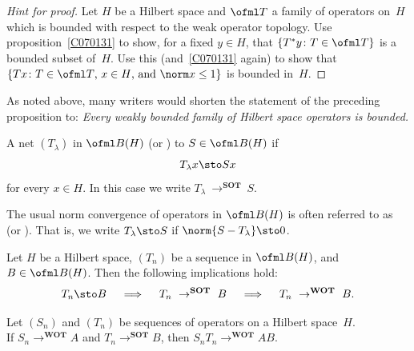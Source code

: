 \begin{proof}[\emph{Hint for proof}] Let $H$ be a Hilbert space and $\ofml T$ a family of operators on~$H$
which is bounded with respect to the weak operator topology. Use proposition~\ref{C070131} to show, for a
fixed $y \in H$, that $\{T^*y\colon T \in \ofml T\}$ is a bounded subset of~$H$.  Use this (and~\ref{C070131}
again) to show that $\{Tx\colon \text{$T \in \ofml T$, $x \in H$, and $\norm x \le 1$}\}$ is bounded in~$H$. \ns
\end{proof}

As noted above, many writers would shorten the statement of the preceding proposition to:
\emph{Every weakly bounded family of Hilbert space operators is bounded.}

\begin{defn}
A net $(T_\lambda)$ in $\ofml B(H)$
 (or ) to $S \in \ofml B(H)$ if
  \[ T_\lambda x \sto Sx \]
for every $x \in H$.  In this case we write $T_\lambda~\to^{\textbf{SOT}}~S$.

The usual norm convergence of operators in $\ofml B(H)$ is often referred to as
 (or ).  That is, we write
$T_\lambda \sto S$ if $\norm{S - T_\lambda}\sto 0$.
\end{defn}

\begin{prop} Let $H$ be a Hilbert space, $(T_n)$ be a sequence in $\ofml B(H)$,
and $B \in \ofml B(H)$. Then the following implications hold:
   \[ T_n \sto B \quad \implies \quad T_n~\to^{\textbf{SOT}}~B
                                \quad \implies \quad T_n~\to^{\textbf{WOT}}~B. \]
\end{prop}

\begin{prop} Let $(S_n)$ and $(T_n)$ be sequences of operators on a Hilbert space~$H$. \\
If $S_n \to^{\textbf{WOT}} A$ and $T_n \to^{\textbf{SOT}} B$, then $S_nT_n \to^{\textbf{WOT}} AB$.
\end{prop}

